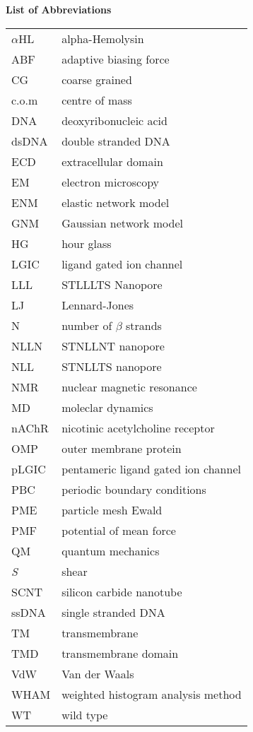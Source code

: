 %

\begin{center}
\vspace*{1.5cm}
{\Large \bfseries List of Abbreviations}
\end{center}


\begin{longtable}[l]{p{200pt} p{500pt}}
$\alpha$HL & alpha-Hemolysin \\
ABF & adaptive biasing force \\
CG & coarse grained \\
c.o.m & centre of mass \\
DNA & deoxyribonucleic acid \\
dsDNA & double stranded DNA \\
ECD & extracellular domain \\
EM & electron microscopy \\
ENM & elastic network model \\
GNM & Gaussian network model \\
HG & hour glass \\
LGIC & ligand gated ion channel \\
LLL & STLLLTS Nanopore \\
LJ & Lennard-Jones \\
N & number of $\beta$ strands \\
NLLN & STNLLNT nanopore \\ 
NLL & STNLLTS nanopore \\
NMR & nuclear magnetic resonance \\ 
MD & moleclar dynamics  \\
nAChR & nicotinic acetylcholine receptor \\ 
OMP & outer membrane protein \\
pLGIC & pentameric ligand gated ion channel \\
PBC & periodic boundary conditions \\
PME & particle mesh Ewald \\
PMF & potential of mean force \\
QM & quantum mechanics \\
\textit{S} & shear \\
SCNT & silicon carbide nanotube \\
ssDNA & single stranded DNA \\
TM & transmembrane \\
TMD & transmembrane domain \\
VdW & Van der Waals \\
WHAM & weighted histogram analysis method \\
WT & wild type \\
\end{longtable}

%
